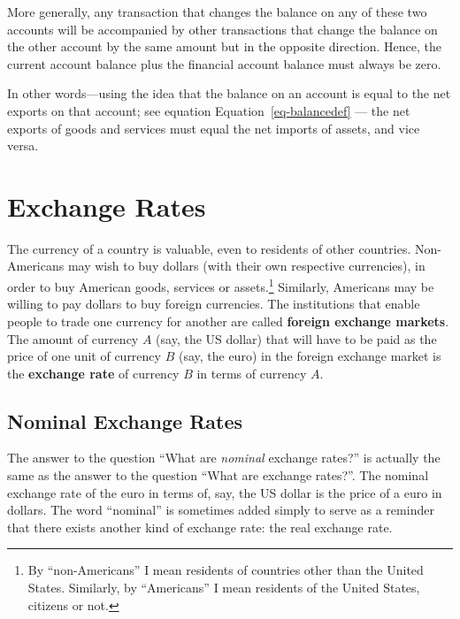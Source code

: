 \documentclass[
  letterpaper,
]{book}
\theoremstyle{plain}
\theoremstyle{remark}
\begin{document}
More generally, any transaction that changes the balance on any of these
two accounts will be accompanied by other transactions that change the
balance on the other account by the same amount but in the opposite
direction. Hence, the current account balance plus the financial account
balance must always be zero.

In other words---using the idea that the balance on an account is equal
to the net exports on that account; see equation
Equation~\ref{eq-balancedef} --- the net exports of goods and services
must equal the net imports of assets, and vice versa.


\chapter{Exchange Rates}\label{sec-exrates}

The currency of a country is valuable, even to residents of other
countries. Non-Americans may wish to buy dollars (with their own
respective currencies), in order to buy American goods, services or
assets.\footnote{By ``non-Americans'' I mean residents of countries
  other than the United States. Similarly, by ``Americans'' I mean
  residents of the United States, citizens or not.} Similarly, Americans
may be willing to pay dollars to buy foreign currencies. The
institutions that enable people to trade one currency for another are
called \textbf{foreign exchange
markets}. The amount of currency \(A\)
(say, the US dollar) that will have to be paid as the price of one unit
of currency \(B\) (say, the euro) in the foreign exchange market is the
\textbf{exchange rate} of currency \(B\) in terms
of currency \(A\).

\section{Nominal Exchange Rates}\label{sec-nomexrates}

The answer to the question ``What are \emph{nominal} exchange rates?''
is actually the same as the answer to the question ``What are exchange
rates?''. The nominal exchange
rate of the euro in terms of,
say, the US dollar is the price of a euro in dollars. The word
``nominal'' is sometimes added simply to serve as a reminder that there
exists another kind of exchange rate: the real exchange rate.
\end{document}
